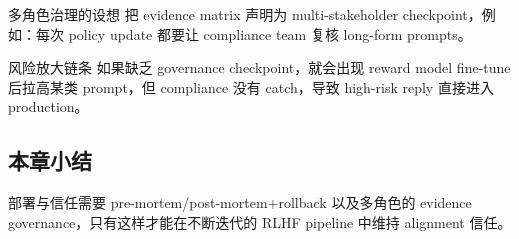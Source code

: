 \begin{knowledgebox}{多角色治理的设想}
把 evidence matrix 声明为 multi-stakeholder checkpoint，例如：每次 policy update 都要让 compliance team 复核 long-form prompts。
\end{knowledgebox}

\begin{warningbox}{风险放大链条}
如果缺乏 governance checkpoint，就会出现 reward model fine-tune 后拉高某类 prompt，但 compliance 没有 catch，导致 high-risk reply 直接进入 production。
\end{warningbox}

\subsection{本章小结}

部署与信任需要 pre-mortem/post-mortem+rollback 以及多角色的 evidence governance，只有这样才能在不断迭代的 RLHF pipeline 中维持 alignment 信任。

